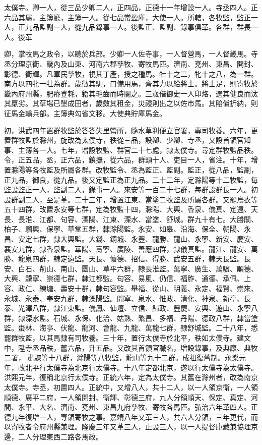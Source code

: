 太僕寺。卿一人，從三品少卿二人，正四品，正德十一年增設一人。寺丞四人。正六品其屬，主簿廳，主簿一人。從七品常盈庫，大使一人。所轄，各牧監，監正一人，正九品監副一人，從九品錄事一人。後監正、監副、錄事俱革。各群，群長一人。後革

卿，掌牧馬之政令，以聽於兵部。少卿一人佐寺事，一人督營馬，一人督畿馬。寺丞分理京衛、畿內及山東、河南六郡孳牧、寄牧馬匹。濟南、兗州、東昌、開封、彰德、衛輝。凡軍民孳牧，視其丁產，授之種馬。牡十之二，牝十之八，為一群。南方以四牝一牡為群。歲徵其駒，曰備用馬，齊其力以給將士。將士足，則寄牧於畿內府州縣，肥瘠登耗，籍其毛齒而時閱之。三歲偕御史一人印烙，選其健良而汰其羸劣。其草場已墾成田者，歲斂其租金，災祲則出之以佐市馬。其賠償折納，則征馬金輸兵部。主簿典勾省文移。大使典貯庫馬金。

初，洪武四年置群牧監於答答失里營所，隨水草利便立官署，專司牧養。六年，更置群牧監於滁州，旋改為太僕寺，秩從三品，設卿、少卿、寺丞，又設首領官知事、主簿各一人。七年，增設牧監、群官二十七處，隸太僕寺。尋定群牧監品秩。令，正五品，丞，正六品，鎮撫，從六品，群頭十人、吏目一人，省注。十年，增置滁陽等各牧監及所屬各群。改牧監令、丞為監正、監副。監正，從八品，監副，正九品，御良，從九品。後又定監正為正九品。二十二年，定滁陽等十二牧監，每監設監正一人，監副二人，錄事一人。來安等一百二十七群，每群設群長一人。初設群副二人，至是革。二十三年，增置江東、當塗二牧監及所屬各群。又罷烏衣等五十四群，改置永安等七群，定為牧監十四，滁陽、大興、香泉、儀真、定遠、天長、長淮、江都、句容、溧陽、江東、溧水、當塗、舒城。群九十有七。大勝關、柏子、騮興、保寧、草堂五群，隸滁陽監。永安、如皋、沿海、保全、朝陽、永昌、安定七群，隸大興監。大錢、銅城、永豐、龍勝、龍山、永寧、新安、慶安、襄安九群，隸香泉監。華陽、壽寧、廣陵、善應四群，隸儀真監。龍江、龍安、萬勝、龍泉四群，隸定遠監。天長、懷德、招信、得勝、武安五群，隸天長監。長安、白石、荊山、南山、團山、草平六群，隸長淮監。萬寧、廣生、萬驥、順德、大興、驥寧、崇德七群，隸江都監。句容、易風、仍信、福胙、通德、承佩、上容、政仁、練塘、壽安十群，隸句容監。舉福、從山、明義、永定、福賢、崇來、永城、永泰、奉安九群，隸溧陽監。開寧、泉水、惟政、清化、神泉、新亭、長泰、光澤八群，隸江東監。儀鳳、仙壇、立信、歸政、豐慶、安興、遊山、永寧八群，隸溧水監。石城、永保、化洽、姑熟、繁昌、多福、丹陽、德政八群，隸當塗監。棗林、海亭、伏龍、龍河、會龍、九龍、萬龍七群，隸舒城監。二十八年，悉罷群牧監，以其馬隸有司牧養。三十年，置行太僕寺於北平，秩如太僕寺。建文中，陞寺丞品秩，舊六品，升五品。又改其首領官職名，增設錄事，及典廄、典牧二署，肅騻等十八群，滁陽等八牧監，龍山等九十二群。成祖復舊制。永樂元年，改北平行太僕寺為北京行太僕寺。十八年定都北京，遂以行太僕寺為太僕寺。洪熙元年，復稱北京行太僕寺。正統六年，定為太僕寺。其舊在滁州者，改為南京太僕寺。寺丞，初置四人。正統中，又增八人，共十二人，以一人領京衛，一人領順德、廣平二府，一人領開封、衛輝、彰德三府，九人分領順天、保定、真定、河間、永平、大名、濟南、兗州、東昌九府孳牧、寄牧各馬匹。弘治六年革四人。正德九年復增一人，專領寄牧之事。嘉靖八年又革三人，共六人分領，三年更代，而以寄牧者令府州縣兼理。隆慶三年又革三人，止設三人，以一人提督庫藏兼協理京邊，二人分理東西二路各馬政。

